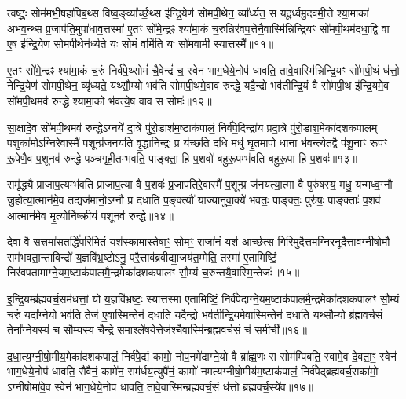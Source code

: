 त्वष्टुः॒ सोम॑मभी॒षहा॑पिब॒थ्स विष्व॒ङ्व्या᳚र्च्छ॒थ्स इ॑न्द्रि॒येण॑ सोमपी॒थेन॒ व्या᳚र्ध्यत॒ स यदू॒र्ध्वमु॒दव॑मी॒त्ते श्या॒माका॑ अभव॒न्थ्स प्र॒जाप॑ति॒मुपा॑धाव॒त्तस्मा॑ ए॒तꣳ सो॑मे॒न्द्रꣴ श्या॑मा॒कं च॒रुन्निर॑वप॒त्तेनै॒वास्मि॑न्निन्द्रि॒यꣳ सो॑मपी॒थम॑दधा॒द्वि वा ए॒ष इ॑न्द्रि॒येण॑ सोमपी॒थेन॑र्ध्यते॒ यः सोमं॒ वमि॑ति॒ यः सो॑मवा॒मी स्यात्तस्मै᳚॥११॥

ए॒तꣳ सो॑मे॒न्द्रꣴ श्या॑मा॒कं च॒रुं निर्व॑पे॒थ्सोमं॑ चै॒वेन्द्रं॑ च॒ स्वेन॑ भाग॒धेये॒नोप॑ धावति॒ तावे॒वास्मि॑न्निन्द्रि॒यꣳ सो॑मपी॒थं ध॑त्तो॒ नेन्द्रि॒येण॑ सोमपी॒थेन॒ व्यृ॑ध्यते॒ यथ्सौ॒म्यो भव॑ति सोमपी॒थमे॒वाव॑ रुन्द्धे॒ यदै॒न्द्रो भव॑तीन्द्रि॒यं वै सो॑मपी॒थ इ॑न्द्रि॒यमे॒व सो॑मपी॒थमव॑ रुन्द्धे श्यामा॒को भ॑वत्ये॒ष वाव स सोमः॑॥१२॥

सा॒क्षादे॒व सो॑मपी॒थमव॑ रुन्द्धे॒\-ऽग्नये॑ दा॒त्रे पु॑रो॒डाश॑म॒ष्टाक॑पालं॒ निर्व॑पे॒दिन्द्रा॑य प्रदा॒त्रे पु॑रो॒डाश॒मेका॑दशकपालम् प॒शुका॑मो॒\-ऽग्निरे॒वास्मै॑ प॒शून्प्र॑ज॒नय॑ति वृ॒द्धानिन्द्रः॒ प्र य॑च्छति॒ दधि॒ मधु॑ घृ॒तमापो॑ धा॒ना भ॑वन्त्ये॒तद्वै प॑शू॒नाꣳ रू॒पꣳ रू॒पेणै॒व प॒शूनव॑ रुन्द्धे पञ्चगृही॒तम्भ॑वति॒ पाङ्क्ता॒ हि प॒शवो॑ बहुरू॒पम्भ॑वति बहुरू॒पा हि प॒शवः॑॥१३॥

समृ॑द्ध्यै प्राजाप॒त्यम्भ॑वति प्राजाप॒त्या वै प॒शवः॑ प्र॒जाप॑तिरे॒वास्मै॑ प॒शून्प्र ज॑नयत्या॒त्मा वै पुरु॑षस्य॒ मधु॒ यन्मध्व॒ग्नौ जु॒होत्या॒त्मान॑मे॒व तद्यज॑मानो॒\-ऽग्नौ प्र द॑धाति प॒ङ्क्त्यौ॑ याज्यानुवा॒क्ये॑ भवतः॒ पाङ्क्तः॒ पुरु॑षः॒ पाङ्क्ताः᳚ प॒शव॑ आ॒त्मान॑मे॒व मृ॒त्योर्नि॒ष्क्रीय॑ प॒शूनव॑ रुन्द्धे॥१४॥

{\anuvakamend[{इ॒न्द्रि॒ये᳚\-ऽस्मि॒न्भूम्या॑ ए॒तामिन्द्रः॒ स्यात्तस्मै॒ सोमो॑ बहुरू॒पा हि प॒शव॒ एक॑चत्वारिꣳशच्च॥२॥}]}

दे॒वा वै स॒त्त्रमा॑स॒तर्द्धि॑परिमितं॒ यश॑स्कामा॒स्तेषा॒ꣳ॒ सोम॒ꣳ॒ राजा॑नं॒ यश॑ आर्च्छ॒त्स गि॒रिमुदै॒त्तम॒ग्निरनूदै॒त्ताव॒ग्नीषोमौ॒ सम॑भवता॒न्ताविन्द्रो॑ य॒ज्ञवि॑भ्र॒ष्टो\-ऽनु॒ परै॒त्ताव॑ब्रवीद्या॒जय॑त॒म्मेति॒ तस्मा॑ ए॒तामिष्टिं॒ निर॑वपतामाग्ने॒यम॒ष्टाक॑पालमै॒न्द्रमेका॑दशकपालꣳ सौ॒म्यं च॒रुन्तयै॒वास्मि॒न्तेजः॑॥१५॥

इ॒न्द्रि॒यम्ब्र॑ह्मवर्च॒सम॑धत्तां॒ यो य॒ज्ञवि॑भ्रष्टः॒ स्यात्तस्मा॑ ए॒तामिष्टिं॒ निर्व॑पेदाग्ने॒यम॒ष्टाक॑पालमै॒न्द्रमेका॑दशकपालꣳ सौ॒म्यं च॒रुं यदा᳚ग्ने॒यो भव॑ति॒ तेज॑ ए॒वास्मि॒न्तेन॑ दधाति॒ यदै॒न्द्रो भव॑तीन्द्रि॒यमे॒वास्मि॒न्तेन॑ दधाति॒ यथ्सौ॒म्यो ब्र॑ह्मवर्च॒सं तेना᳚ग्ने॒यस्य॑ च सौ॒म्यस्य॑ चै॒न्द्रे स॒माश्ले॑षये॒त्तेज॑श्चै॒वास्मि॑न्ब्रह्मवर्च॒सं च॑ स॒मीची᳚॥१६॥

द॒धा॒त्य॒ग्नी॒षो॒मीय॒मेका॑दशकपालं॒ निर्व॑पे॒द्यं कामो॒ नोप॒नमे॑दाग्ने॒यो वै ब्रा᳚ह्म॒णः स सोम॑म्पिबति॒ स्वामे॒व दे॒वता॒ꣳ॒ स्वेन॑ भाग॒धेये॒नोप॑ धावति॒ सैवैनं॒ कामे॑न॒ सम॑र्धय॒त्युपै॑नं॒ कामो॑ नमत्यग्नीषो॒मीय॑म॒ष्टाक॑पालं॒ निर्व॑पेद्ब्रह्मवर्च॒सका॑मो॒ \-ऽग्नीषोमा॑वे॒व स्वेन॑ भाग॒धेये॒नोप॑ धावति॒ तावे॒वास्मि॑न्ब्रह्मवर्च॒सं ध॑त्तो ब्रह्मवर्च॒स्ये॑व॥१७॥

